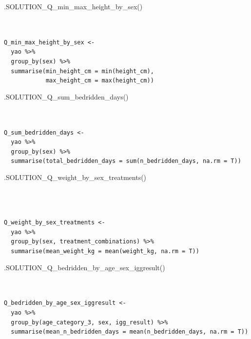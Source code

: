 \documentclass[
  letterpaper,
  DIV=11,
  numbers=noendperiod]{scrreprt}
\newenvironment{Shaded}{\begin{snugshade}}{\end{snugshade}}
\newcommand{\FunctionTok}[1]{\textcolor[rgb]{0.28,0.35,0.67}{#1}}
\newcommand{\NormalTok}[1]{\textcolor[rgb]{0.00,0.23,0.31}{#1}}
\begin{document}
\begin{Shaded}
\begin{Highlighting}[]
\FunctionTok{.SOLUTION\_Q\_min\_max\_height\_by\_sex}\NormalTok{()}
\end{Highlighting}
\end{Shaded}

\begin{verbatim}


Q_min_max_height_by_sex <- 
  yao %>% 
  group_by(sex) %>%
  summarise(min_height_cm = min(height_cm),
            max_height_cm = max(height_cm))
\end{verbatim}

\begin{Shaded}
\begin{Highlighting}[]
\FunctionTok{.SOLUTION\_Q\_sum\_bedridden\_days}\NormalTok{()}
\end{Highlighting}
\end{Shaded}

\begin{verbatim}


Q_sum_bedridden_days <- 
  yao %>% 
  group_by(sex) %>% 
  summarise(total_bedridden_days = sum(n_bedridden_days, na.rm = T))
\end{verbatim}

\begin{Shaded}
\begin{Highlighting}[]
\FunctionTok{.SOLUTION\_Q\_weight\_by\_sex\_treatments}\NormalTok{()}
\end{Highlighting}
\end{Shaded}

\begin{verbatim}


  
Q_weight_by_sex_treatments <- 
  yao %>% 
  group_by(sex, treatment_combinations) %>%
  summarise(mean_weight_kg = mean(weight_kg, na.rm = T))
\end{verbatim}

\begin{Shaded}
\begin{Highlighting}[]
\FunctionTok{.SOLUTION\_Q\_bedridden\_by\_age\_sex\_iggresult}\NormalTok{()}
\end{Highlighting}
\end{Shaded}

\begin{verbatim}


Q_bedridden_by_age_sex_iggresult <- 
  yao %>% 
  group_by(age_category_3, sex, igg_result) %>% 
  summarise(mean_n_bedridden_days = mean(n_bedridden_days, na.rm = T))
\end{verbatim}
\end{document}
